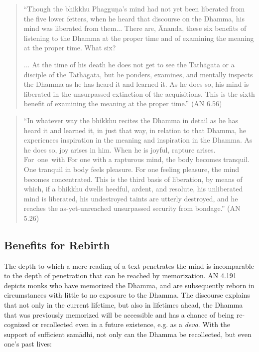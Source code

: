 \begin{quote}
  ``Though the bhikkhu Phagguṇa's mind had not yet been liberated from the five lower fetters, when he heard that discourse on the Dhamma, his mind was liberated from them... There are, Ānanda, these six benefits of listening to the Dhamma at the proper time and of examining the meaning at the proper time. What six?

  ... At the time of his death he does not get to see the Tathāgata or a disciple of the Tathāgata, but he ponders, examines, and mentally inspects the Dhamma as he has heard it and learned it. As he does so, his mind is liberated in the unsurpassed extinction of the acquisitions. This is the sixth benefit of examining the meaning at the proper time.'' (AN 6.56)
\end{quote}

\begin{quote}
  ``In whatever way the bhikkhu recites the Dhamma in detail as he has heard it and learned it, in just that way, in relation to that Dhamma, he experiences inspiration in the meaning and inspiration in the Dhamma. As he does so, joy arises in him. When he is joyful, rapture arises. \ifninebythirteen \mbox{For one}~with \else For one with \fi a rapturous mind, the body becomes tranquil. One tranquil in body feels pleasure. For one feeling pleasure, the mind becomes concentrated. This is the third basis of liberation, by means of which, if a bhikkhu dwells heedful, ardent, and resolute, his unliberated mind is liberated, his undestroyed taints are utterly destroyed, and he reaches the as-yet-unreached unsurpassed security from bondage.'' (AN 5.26)
\end{quote}

\subsection*{Benefits for Rebirth}

The depth to which a mere reading of a text penetrates the mind is incomparable to the depth of penetration that can be reached by memorization. AN 4.191 depicts monks who have memorized the Dhamma, and are subsequently reborn in circumstances with little to no exposure to the Dhamma. The discourse explains that not only in the current lifetime, but also in lifetimes ahead, the Dhamma that was previously memorized will be accessible and has a chance of being re-cognized or recollected even in a future existence, e.g. as a \textit{deva}. With the support of sufficient samādhi, not only can the Dhamma be recollected, but even one's past lives:

